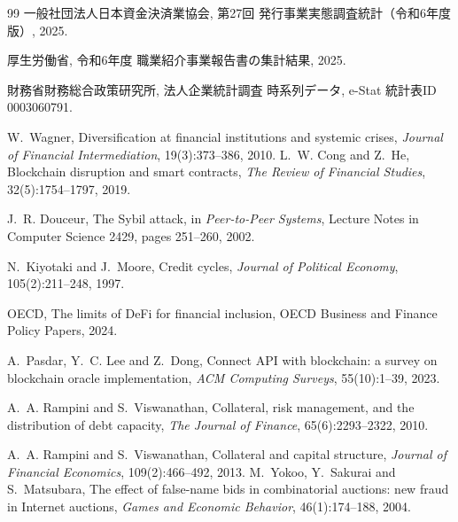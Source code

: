 \begin{thebibliography}{99}
一般社団法人日本資金決済業協会,
\newblock 第27回 発行事業実態調査統計（令和6年度版）, 2025.

厚生労働省,
\newblock 令和6年度 職業紹介事業報告書の集計結果, 2025.

財務省財務総合政策研究所,
\newblock 法人企業統計調査 時系列データ,
\newblock e-Stat 統計表ID 0003060791.

W.~Wagner,
\newblock Diversification at financial institutions and systemic crises,
\newblock \emph{Journal of Financial Intermediation}, 19(3):373--386, 2010.
L.~W. Cong and Z.~He,
\newblock Blockchain disruption and smart contracts,
\newblock \emph{The Review of Financial Studies}, 32(5):1754--1797, 2019.

J.~R. Douceur,
\newblock The Sybil attack,
\newblock in \emph{Peer-to-Peer Systems}, Lecture Notes in Computer Science 2429, pages 251--260, 2002.

N.~Kiyotaki and J.~Moore,
\newblock Credit cycles,
\newblock \emph{Journal of Political Economy}, 105(2):211--248, 1997.

OECD,
\newblock The limits of DeFi for financial inclusion,
\newblock OECD Business and Finance Policy Papers, 2024.

A.~Pasdar, Y.~C. Lee and Z.~Dong,
\newblock Connect API with blockchain: a survey on blockchain oracle implementation,
\newblock \emph{ACM Computing Surveys}, 55(10):1--39, 2023.

A.~A. Rampini and S.~Viswanathan,
\newblock Collateral, risk management, and the distribution of debt capacity,
\newblock \emph{The Journal of Finance}, 65(6):2293--2322, 2010.

A.~A. Rampini and S.~Viswanathan,
\newblock Collateral and capital structure,
\newblock \emph{Journal of Financial Economics}, 109(2):466--492, 2013.
M.~Yokoo, Y.~Sakurai and S.~Matsubara,
\newblock The effect of false-name bids in combinatorial auctions: new fraud in Internet auctions,
\newblock \emph{Games and Economic Behavior}, 46(1):174--188, 2004.
\end{thebibliography}
